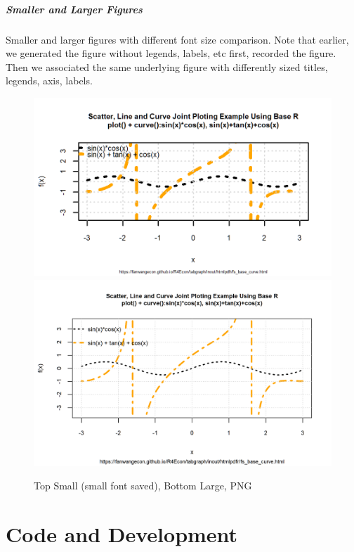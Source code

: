 \documentclass[
]{book}
\begin{document}
\hypertarget{smaller-and-larger-figures}{%
\paragraph{Smaller and Larger Figures}\label{smaller-and-larger-figures}}

Smaller and larger figures with different font size comparison. Note that earlier, we generated the figure without legends, labels, etc first, recorded the figure. Then we associated the same underlying figure with differently sized titles, legends, axis, labels.

\begin{figure}
\centering
\caption{Top Small (small font saved), Bottom Large, PNG}
\includegraphics[width=\linewidth]{_img/fs_img_io_2curve_w80h48_res300.png}
\hfill
\centering
\includegraphics[width=\linewidth]{_img/fs_img_io_2curve_w160h100_res300.png}
\end{figure}

\hypertarget{code-and-development}{%
\chapter{Code and Development}\label{code-and-development}}
\end{document}
